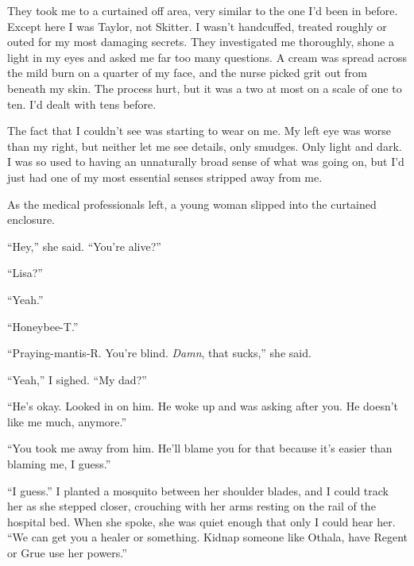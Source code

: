 They took me to a curtained off area, very similar to the one I'd been in before.  Except here I was Taylor, not Skitter.  I wasn't handcuffed, treated roughly or outed for my most damaging secrets.  They investigated me thoroughly, shone a light in my eyes and asked me far too many questions.  A cream was spread across the mild burn on a quarter of my face, and the nurse picked grit out from beneath my skin.  The process hurt, but it was a two at most on a scale of one to ten.  I'd dealt with tens before.



The fact that I couldn't see was starting to wear on me.  My left eye was worse than my right, but neither let me see details, only smudges.  Only light and dark.  I was so used to having an unnaturally broad sense of what was going on, but I'd just had one of my most essential senses stripped away from me.



As the medical professionals left, a young woman slipped into the curtained enclosure.



``Hey,'' she said.  ``You're alive?''



``Lisa?''



``Yeah.''



``Honeybee-T.''



``Praying-mantis-R.  You're blind.  \emph{Damn}, that sucks,'' she said.



``Yeah,'' I sighed.  ``My dad?''



``He's okay.  Looked in on him.  He woke up and was asking after you.  He doesn't like me much, anymore.''



``You took me away from him.  He'll blame you for that because it's easier than blaming me, I guess.''



``I guess.''  I planted a mosquito between her shoulder blades, and I could track her as she stepped closer, crouching with her arms resting on the rail of the hospital bed.  When she spoke, she was quiet enough that only I could hear her.  ``We can get you a healer or something.  Kidnap someone like Othala, have Regent or Grue use her powers.''




